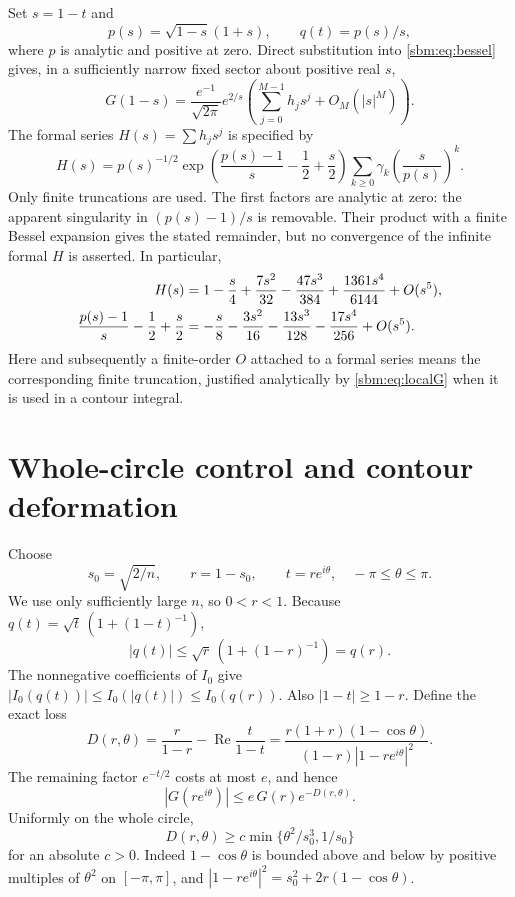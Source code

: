 \documentclass[11pt,letterpaper]{article}
\numberwithin{equation}{section}
\theoremstyle{remark}\newtheorem{remark}[theorem]{Remark}
\newcommand{\Rea}{\operatorname{Re}}
\begin{document}
Set $s=1-t$ and
\begin{equation}\label{sbm:eq:local-p}
 p(s)=\sqrt{1-s}(1+s),\qquad q(t)=p(s)/s,
\end{equation}
where $p$ is analytic and positive at zero. Direct substitution into
\eqref{sbm:eq:bessel} gives, in a sufficiently narrow fixed sector about
positive real $s$,
\begin{equation}\label{sbm:eq:localG}
 G(1-s)=\frac{e^{-1}}{\sqrt{2\pi}}e^{2/s}
 \left(\sum_{j=0}^{M-1}h_js^j+O_M(|s|^M)\right).
\end{equation}
The formal series $H(s)=\sum h_js^j$ is specified by
\begin{equation}\label{sbm:eq:H}
 H(s)=p(s)^{-1/2}
   \exp\left(\frac{p(s)-1}{s}-\frac12+\frac s2\right)
   \sum_{k\geq0}\gamma_k\left(\frac{s}{p(s)}\right)^k.
\end{equation}
Only finite truncations are used. The first factors are analytic at
zero: the apparent singularity in $(p(s)-1)/s$ is removable. Their
product with a finite Bessel expansion gives the stated remainder, but
no convergence of the infinite formal $H$ is asserted. In particular,
\begin{align}\label{sbm:eq:hexp}
 H(s)&=1-\frac s4+\frac{7s^2}{32}-\frac{47s^3}{384}
                      +\frac{1361s^4}{6144}+O(s^5),\notag\\
 \frac{p(s)-1}{s}-\frac12+\frac s2
     &=-\frac s8-\frac{3s^2}{16}-\frac{13s^3}{128}
                      -\frac{17s^4}{256}+O(s^5).
\end{align}
Here and subsequently a finite-order $O$ attached to a formal series
means the corresponding finite truncation, justified analytically by
\eqref{sbm:eq:localG} when it is used in a contour integral.

\section{Whole-circle control and contour deformation}\label{sbm:sec:arcs}
Choose
\[
 s_0=\sqrt{2/n},\qquad r=1-s_0,\qquad
 t=re^{i\theta},\quad -\pi\leq\theta\leq\pi.
\]
We use only sufficiently large $n$, so $0<r<1$. Because
$q(t)=\sqrt t\,(1+(1-t)^{-1})$,
\[
 |q(t)|\leq\sqrt r\,(1+(1-r)^{-1})=q(r).
\]
The nonnegative coefficients of $I_0$ give
$|I_0(q(t))|\leq I_0(|q(t)|)\leq I_0(q(r))$. Also
$|1-t|\geq1-r$. Define the exact loss
\begin{equation}\label{sbm:eq:D}
 D(r,\theta)=\frac r{1-r}-\Rea\frac t{1-t}
  =\frac{r(1+r)(1-\cos\theta)}
        {(1-r)|1-re^{i\theta}|^2}.
\end{equation}
The remaining factor $e^{-t/2}$ costs at most $e$, and hence
\begin{equation}\label{sbm:eq:global}
 |G(re^{i\theta})|\leq e\,G(r)e^{-D(r,\theta)}.
\end{equation}
Uniformly on the whole circle,
\begin{equation}\label{sbm:eq:Dlower}
 D(r,\theta)\geq c\min\{\theta^2/s_0^3,1/s_0\}
\end{equation}
for an absolute $c>0$. Indeed $1-\cos\theta$ is bounded above and below
by positive multiples of $\theta^2$ on $[-\pi,\pi]$, and
$|1-re^{i\theta}|^2=s_0^2+2r(1-\cos\theta)$.
\end{document}

